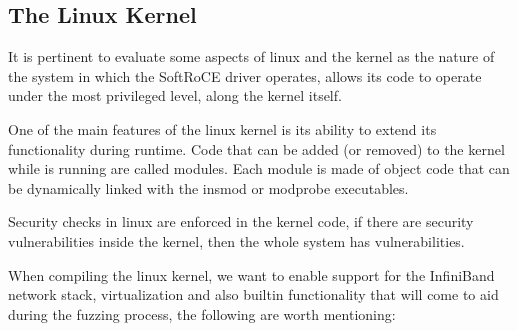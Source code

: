 
\subsection{The Linux Kernel}

It is pertinent to evaluate some aspects of linux and the kernel as the nature of
the system in which the SoftRoCE driver operates, allows its code to operate
under the most privileged level, along the kernel itself.

One of the main features of the linux kernel is its ability to extend
its functionality during runtime. Code that can be added (or removed) to the kernel
while is running are called modules. Each module is made of object code that can
be dynamically linked with the insmod or modprobe executables\cite{ldd3}. 

Security checks in linux are enforced in the kernel code, if there are security vulnerabilities inside
the kernel, then the whole system has vulnerabilities.\cite{ldd3}



When compiling the linux kernel, we want to enable support for the InfiniBand network stack, virtualization and 
also builtin functionality that will come to aid during the fuzzing process, the following are worth
mentioning:

